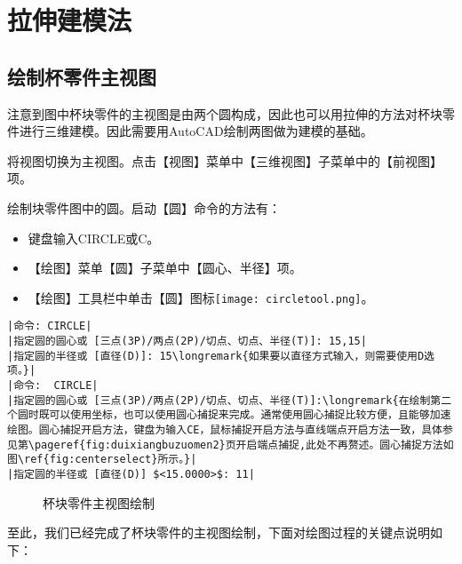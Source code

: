 
\section{拉伸建模法}

\subsection{绘制杯零件主视图}
注意到图中杯块零件的主视图是由两个圆构成，因此也可以用拉伸的方法对杯块零件进行三维建模。因此需要用AutoCAD绘制两图做为建模的基础。
\begin{procedure}
\item 将视图切换为主视图。点击【视图】菜单中【三维视图】子菜单中的【前视图】项。
\item 绘制块零件图中的圆。启动【圆】命令的方法有：
\begin{itemize}
\item 键盘输入CIRCLE或C。
\item 【绘图】菜单【圆】子菜单中【圆心、半径】项。
\item 【绘图】工具栏中单击【圆】图标\texttt{[image: circletool.png]}。
\end{itemize}
\begin{lstlisting}
|命令: CIRCLE|
|指定圆的圆心或 [三点(3P)/两点(2P)/切点、切点、半径(T)]: 15,15|
|指定圆的半径或 [直径(D)]: 15\longremark{如果要以直径方式输入，则需要使用D选项。}|
|命令:  CIRCLE|
|指定圆的圆心或 [三点(3P)/两点(2P)/切点、切点、半径(T)]:\longremark{在绘制第二个圆时既可以使用坐标，也可以使用圆心捕捉来完成。通常使用圆心捕捉比较方便，且能够加速绘图。圆心捕捉开启方法，键盘为输入CE，鼠标捕捉开启方法与直线端点开启方法一致，具体参见第\pageref{fig:duixiangbuzuomen2}页开启端点捕捉,此处不再赘述。圆心捕捉方法如图\ref{fig:centerselect}所示。}|
|指定圆的半径或 [直径(D)] $<15.0000>$: 11|
\end{lstlisting}
\begin{figure}[htbp]
\centering
{}\hspace{20pt}
\caption{杯块零件主视图绘制}
\end{figure}
\end{procedure}

至此，我们已经完成了杯块零件的主视图绘制，下面对绘图过程的关键点说明如下：
\showremarks

\endinput
